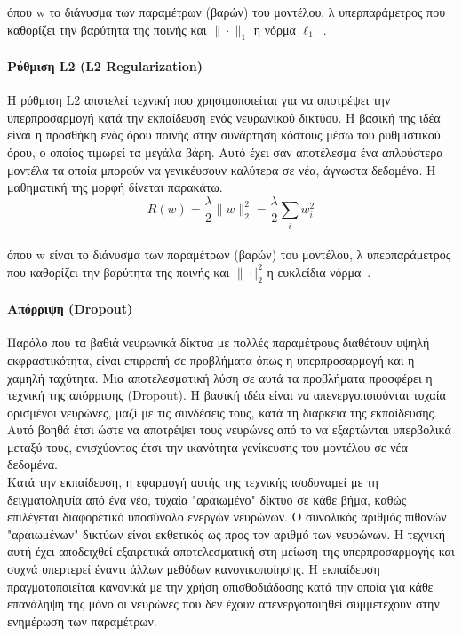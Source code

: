 \documentclass[12pt]{article}
\numberwithin{equation}{section}
\begin{document}
\noindent όπου w το διάνυσμα των παραμέτρων (βαρών) του μοντέλου, λ υπερπαράμετρος που καθορίζει την βαρύτητα της ποινής και \(\|\cdot\|_1\) η νόρμα \(\ell_1\)~\cite{schmidt2009l1}.\\

\paragraph{Ρύθμιση L2 (L2 Regularization) \\ [0.5 cm]}

Η ρύθμιση L2 αποτελεί τεχνική που χρησιμοποιείται για να αποτρέψει την υπερπροσαρμογή κατά την εκπαίδευση ενός νευρωνικού δικτύου. Η βασική της ιδέα είναι η προσθήκη ενός όρου ποινής στην συνάρτηση κόστους μέσω του ρυθμιστικού όρου, ο οποίος τιμωρεί τα μεγάλα βάρη. Αυτό έχει σαν αποτέλεσμα ένα απλούστερα μοντέλα τα οποία μπορούν να γενικέυσουν καλύτερα σε νέα, άγνωστα δεδομένα. Η μαθηματική της μορφή δίνεται παρακάτω. \\

\begin{equation}
R(w) = \frac{\lambda}{2} \|w\|_2^2 = \frac{\lambda}{2} \sum_i w_i^2
\end{equation}\\

\noindent όπου w είναι το διάνυσμα των παραμέτρων (βαρών)  του μοντέλου, λ υπερπαράμετρος που καθορίζει την βαρύτητα της ποινής και \(\|\cdot|_2^2\) η ευκλείδια νόρμα~\cite{lewkowycz2021trainingdynamicsdeepnetworks}.\\



\paragraph{Απόρριψη (Dropout) \\ [0.5 cm]}

Παρόλο που τα βαθιά νευρωνικά δίκτυα με πολλές παραμέτρους διαθέτουν υψηλή εκφραστικότητα, είναι επιρρεπή σε προβλήματα όπως η υπερπροσαρμογή και η χαμηλή ταχύτητα. Μια αποτελεσματική λύση σε αυτά τα προβλήματα προσφέρει η τεχνική της απόρριψης (Dropout). Η βασική ιδέα είναι να απενεργοποιούνται τυχαία ορισμένοι νευρώνες, μαζί με τις συνδέσεις τους, κατά τη διάρκεια της εκπαίδευσης. Αυτό βοηθά έτσι ώστε να αποτρέψει τους νευρώνες από το να εξαρτώνται υπερβολικά μεταξύ τους, ενισχύοντας έτσι την ικανότητα γενίκευσης του μοντέλου σε νέα δεδομένα. \\

\noindent Κατά την εκπαίδευση, η εφαρμογή αυτής της τεχνικής ισοδυναμεί με τη δειγματοληψία από ένα νέο, τυχαία "αραιωμένο" δίκτυο σε κάθε βήμα, καθώς επιλέγεται διαφορετικό υποσύνολο ενεργών νευρώνων. Ο συνολικός αριθμός πιθανών "αραιωμένων" δικτύων είναι εκθετικός ως προς τον αριθμό των νευρώνων. Η τεχνική αυτή έχει αποδειχθεί εξαιρετικά αποτελεσματική στη μείωση της υπερπροσαρμογής και συχνά υπερτερεί έναντι άλλων μεθόδων κανονικοποίησης. Η εκπαίδευση πραγματοποιείται κανονικά με την χρήση οπισθοδιάδοσης κατά την οποία για κάθε επανάληψη της μόνο οι νευρώνες που δεν έχουν απενεργοποιηθεί συμμετέχουν στην ενημέρωση των παραμέτρων. \\
\end{document}
